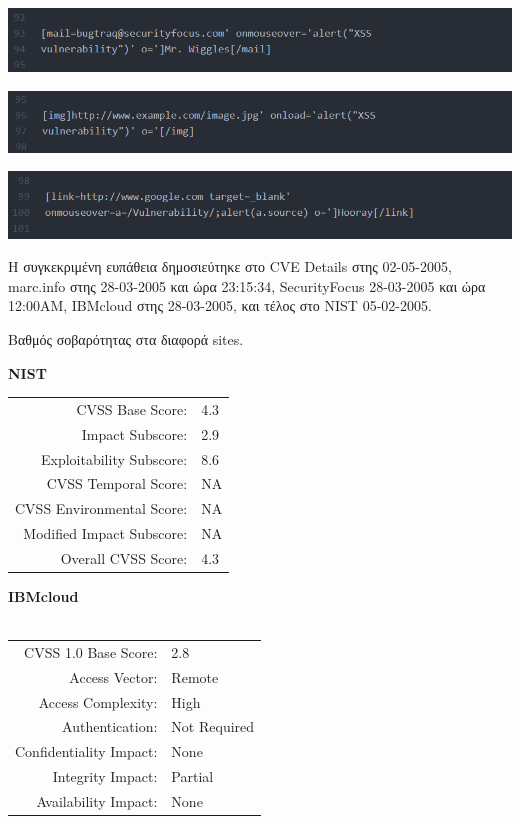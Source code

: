 \begin{center}
			\includegraphics[width=1\textwidth]{image/28.PNG}		
\end{center}

\begin{center}
			\includegraphics[width=1\textwidth]{image/29.PNG}		
\end{center}

\begin{center}
			\includegraphics[width=1\textwidth]{image/30.PNG}		
\end{center}

\noindent
Η συγκεκριμένη ευπάθεια δημοσιεύτηκε στο CVE Details στης 02-05-2005, marc.info στης 28-03-2005 και ώρα 23:15:34, SecurityFocus 28-03-2005 και ώρα 12:00ΑΜ, ΙΒΜcloud στης 28-03-2005, και τέλος στο NIST 05-02-2005. 

\noindent
Βαθμός σοβαρότητας στα διαφορά sites. 



\textbf{NIST}

\begin{tabular}{rl}
\hline
CVSS Base Score: & 	4.3\\
Impact Subscore: & 2.9 \\ 
Exploitability Subscore: & 8.6\\
CVSS Temporal Score: &    NA\\
CVSS Environmental Score: &  NA\\
Modified Impact Subscore: &    NA\\
Overall CVSS Score: &    4.3\\
\hline
\end{tabular}

\textbf{ΙΒΜcloud}
\\
\\
\begin{tabular}{rl}
\hline
CVSS 1.0 Base Score: & 2.8 \\
Access Vector: 	& Remote \\
Access Complexity: &	High \\ 
Authentication: & Not Required \\
Confidentiality Impact: & None \\
Integrity Impact: & Partial \\ 
Availability Impact: & None \\
\hline
\end{tabular}


